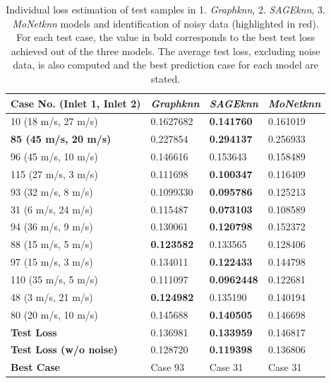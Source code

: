 \begin{table}[ht]
    \centering
    \caption{Individual loss estimation of test samples in 1. \textit{Graphknn}, 2. \textit{SAGEknn}, 3. \textit{MoNetknn} models and identification of noisy data (highlighted in red). For each test case, the value in bold corresponds to the best test loss achieved out of the three models. The average test loss, excluding noise data, is also computed and the best prediction case for each model are stated.}
    \label{t:}
    \begin{tabular}{|l|l|l|l|}
        \hline
        \textbf{Case No. (Inlet 1, Inlet 2)} & \textit{Graphknn} & \textit{SAGEknn} & \textit{MoNetknn} \\
        \hline
        10 (18 m/s, 27 m/s)& 0.1627682& \textbf{0.141760} & 0.161019\\
        \hline
        \rowcolor{red!30}\textbf{85 (45 m/s, 20 m/s)} & 0.227854 & \textbf{0.294137} & 0.256933\\
        \hline
        96 (45 m/s, 10 m/s)& 0.146616 & 0.153643 & 0.158489 \\
        \hline
        115 (27 m/s, 3 m/s)& 0.111698& \textbf{0.100347} & 0.116409 \\
        \hline
        93 (32 m/s, 8 m/s)& 0.1099330 & \textbf{0.095786} & 0.125213 \\
        \hline
        31 (6 m/s, 24 m/s) & 0.115487& \textbf{0.073103} & 0.108589 \\
        \hline
        94 (36 m/s, 9 m/s)& 0.130061 & \textbf{0.120798} & 0.152372 \\
        \hline
        88 (15 m/s, 5 m/s)& \textbf{0.123582} & 0.133565 & 0.128406 \\
        \hline
        97 (15 m/s, 3 m/s)& 0.134011 & \textbf{0.122433} & 0.144798 \\
        \hline
        110 (35 m/s, 5 m/s)& 0.111097 & \textbf{0.0962448} & 0.122681 \\
        \hline
        48 (3 m/s, 21 m/s)& \textbf{0.124982}& 0.135190 & 0.140194 \\
        \hline
        80 (20 m/s, 10 m/s)& 0.145688 & \textbf{0.140505} & 0.146698 \\
        \hline
        \textbf{Test Loss} & 0.136981 & \textbf{0.133959}& 0.146817\\
        \hline
        \textbf{Test Loss (w/o noise)} & 0.128720 & \textbf{0.119398} & 0.136806\\
        \hline
        \textbf{Best Case} & Case 93 & Case 31& Case 31\\
        \hline
    \end{tabular}
\end{table}





